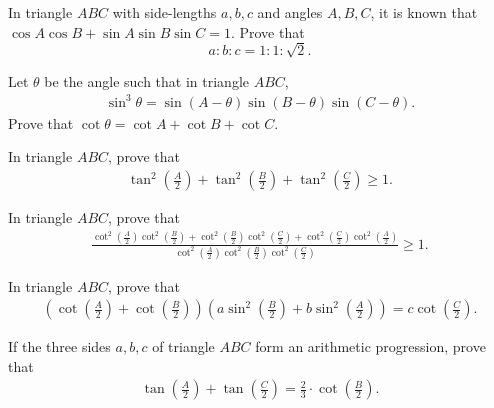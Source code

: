 \documentclass[12pt,a4paper]{memoir}
\theoremstyle{definition}
\begin{document}
\begin{question}[name=1986 IIT JEE]
	In triangle $ABC$ with side-lengths $a,b,c$ and angles $A,B,C$, it is known that $\cos A \cos B + \sin A \sin B \sin C = 1$. Prove that $$a:b:c = 1:1:\sqrt 2.$$
\end{question}

\begin{question}
	Let $\theta$ be the angle such that in triangle $ABC$,
	\begin{align*}
		\sin^3\theta = \sin(A-\theta)\sin(B-\theta)\sin(C-\theta).
	\end{align*}
	Prove that $\cot \theta = \cot A + \cot B + \cot C$.
\end{question}

\begin{question}
	In triangle $ABC$, prove that
	\begin{align*}
		\tan^2\left(\frac{A}{2}\right)+\tan^2\left(\frac{B}{2}\right)+\tan^2\left(\frac{C}{2}\right) \geq 1.
	\end{align*}
\end{question}

\begin{question}
	In triangle $ABC$, prove that
	\begin{align*}
		\frac{\displaystyle\cot^2\left(\frac{A}{2}\right)\cot^2\left(\frac{B}{2}\right)+\cot^2\left(\frac{B}{2}\right)\cot^2\left(\frac{C}{2}\right)+\cot^2\left(\frac{C}{2}\right)\cot^2\left(\frac{A}{2}\right)}{\displaystyle\cot^2\left(\frac{A}{2}\right)\cot^2\left(\frac{B}{2}\right)\cot^2\left(\frac{C}{2}\right)} \geq 1.
	\end{align*}
\end{question}


\begin{question}
	In triangle $ABC$, prove that
	\begin{align*}
		\left(\cot\left(\frac{A}{2}\right)+\cot\left(\frac{B}{2}\right)\right)\left(a\sin^2\left(\frac{B}{2}\right)+b\sin^2\left(\frac{A}{2}\right)\right) = c \cot\left(\frac{C}{2}\right).
	\end{align*}
\end{question}


\begin{question}
	If the three sides $a,b,c$ of triangle $ABC$ form an arithmetic progression, prove that
	\begin{align*}
		\tan\left(\frac{A}{2}\right)+\tan\left(\frac{C}{2}\right)=\frac{2}{3}\cdot \cot\left(\frac{B}{2}\right).
	\end{align*}
\end{question}
\end{document}
